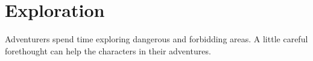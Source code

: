\section{Exploration}
Adventurers spend time exploring dangerous and forbidding areas. A little careful forethought can help the characters in their adventures.


